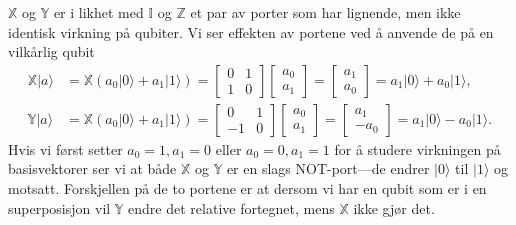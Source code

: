 $\mathbb{X}$ og $\mathbb{Y}$ er i likhet med $\mathbb{I}$ og $\mathbb{Z}$ et par av porter som har lignende, men ikke identisk virkning på qubiter. Vi ser effekten av portene ved å anvende de på en vilkårlig qubit
\begin{align*}
	\mathbb{X}|a\rangle &= \mathbb{X}(a_0|0\rangle + a_1|1\rangle)= \left[\begin{array}{cc}0 & 1 \\ 1 & 0 \end{array}\right]\left[\begin{array}{c} a_0 \\ a_1\end{array}\right] 
	= \left[\begin{array}{c} a_1 \\ a_0\end{array}\right] = a_1|0\rangle + a_0|1\rangle, \\
	\mathbb{Y}|a\rangle &= \mathbb{X}(a_0|0\rangle + a_1|1\rangle)= \left[\begin{array}{cc}0 & 1 \\ -1 & 0 \end{array}\right]\left[\begin{array}{c} a_0 \\ a_1\end{array}\right] 
	= \left[\begin{array}{c} a_1 \\ -a_0\end{array}\right] = a_1|0\rangle - a_0|1\rangle.
\end{align*}
Hvis vi først setter $a_0=1, a_1=0$ eller $a_0=0, a_1=1$ for å studere virkningen på basisvektorer ser vi at både $\mathbb{X}$ og $\mathbb{Y}$ er en slags NOT-port---de endrer $|0\rangle$ til $|1\rangle$ og motsatt. Forskjellen på de to portene er at dersom vi har en qubit som er i en superposisjon vil $\mathbb{Y}$ endre det relative fortegnet, mens $\mathbb{X}$ ikke gjør det.

